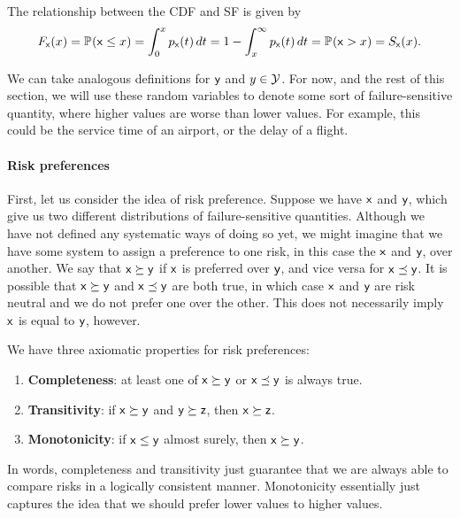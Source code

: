 \begin{definition}
    The relationship between the CDF and SF is given by
    \begin{equation}
    \Fxd{x} = \PR{}{\rx\le x} = \int_{0}^x \pxd{t}\,dt = 1-\int_{x}^\infty \pxd{t}\,dt = \PR{}{\rx > x} = \Sxd{x}.
\end{equation}
\end{definition}

We can take analogous definitions for $\mathsf y$ and $y\in\mathcal{Y}$. For now, and the rest of this section, we will use these random variables to denote some sort of failure-sensitive quantity, where higher values are worse than lower values. For example, this could be the service time of an airport, or the delay of a flight. 

\paragraph{Risk preferences} First, let us consider the idea of risk preference. Suppose we have $\mathsf x$ and $\mathsf y$, which give us two different distributions of failure-sensitive quantities. Although we have not defined any systematic ways of doing so yet, we might imagine that we have some system to assign a preference to one risk, in this case the $\mathsf x$ and $\mathsf y$, over another. We say that $\mathsf x \succeq \mathsf y$ if $\mathsf x$ is preferred over $\mathsf y$, and vice versa for $\mathsf x \preceq \mathsf y$. It is possible that $\mathsf x\succeq \mathsf y $ and $\mathsf x \preceq \mathsf y$ are both true, in which case $\mathsf x$ and $\mathsf y$ are risk neutral and we do not prefer one over the other. This does not necessarily imply $\mathsf x$ is equal to $\mathsf y$, however. 

\begin{proposition}
    We have three axiomatic properties for risk preferences:
    \begin{enumerate}
        \item \textbf{Completeness}: at least one of $\mathsf x \succeq \mathsf y$ or $\mathsf x\preceq\mathsf y$ is always true.
        \item \textbf{Transitivity}: if $\mathsf x \succeq \mathsf y$ and $\mathsf y\succeq \mathsf z$, then $\mathsf x\succeq \mathsf z$.
        \item \textbf{Monotonicity}: if $\mathsf x \le \mathsf y$ almost surely, then $\mathsf x \succeq \mathsf y$.
    \end{enumerate}
\end{proposition} 
In words, completeness and transitivity just guarantee that we are always able to compare risks in a logically consistent manner. Monotonicity essentially just captures the idea that we should prefer lower values to higher values.

